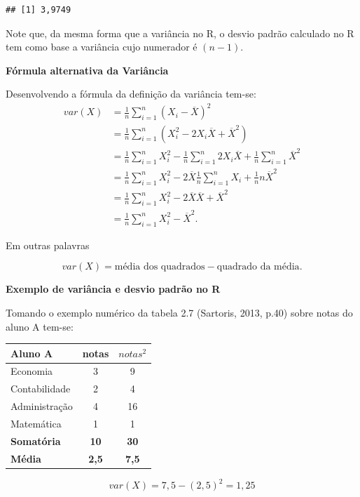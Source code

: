 \documentclass[
]{book}
\begin{document}
\begin{verbatim}
## [1] 3,9749
\end{verbatim}

Note que, da mesma forma que a variância no R, o desvio padrão calculado no R tem como base a variância cujo numerador é \((n-1)\).

\textbf{Fórmula alternativa da Variância}

Desenvolvendo a fórmula da definição da variância tem-se:
\begin{align*}
  var(X)  &= \frac{1}{n}\sum_{i=1}^{n}(X_i - \overline{X})^2 \\
          &= \frac{1}{n}\sum_{i=1}^{n}(X_i^2 - 2X_i\overline{X} +
          \overline{X}^2)\\
          &= \frac{1}{n}\sum_{i=1}^{n}X_i^2 - 
          \frac{1}{n}\sum_{i=1}^{n}2X_i\overline{X}+
          \frac{1}{n}\sum_{i=1}^{n}\overline{X}^2\\
          &= \frac{1}{n}\sum_{i=1}^{n}X_i^2 - 
          2\overline{X}\frac{1}{n}\sum_{i=1}^{n}X_i+
          \frac{1}{n}n\overline{X}^2\\
          &= \frac{1}{n}\sum_{i=1}^{n}X_i^2 - 
          2\overline{X}\overline{X}+ \overline{X}^2\\
          &= \frac{1}{n}\sum_{i=1}^{n}X_i^2 - \overline{X}^2.
\end{align*}

Em outras palavras

\begin{equation*}
  var(X) = \text{média dos quadrados} - \text{quadrado da média}.
\end{equation*}

\textbf{Exemplo de variância e desvio padrão no R}

Tomando o exemplo numérico da tabela 2.7 (Sartoris, 2013, p.40) sobre notas do
aluno A tem-se:

\begin{longtable}[]{@{}lcc@{}}
\toprule
Aluno A & notas & \(notas^2\)\tabularnewline
\midrule
\endhead
Economia & 3 & 9\tabularnewline
Contabilidade & 2 & 4\tabularnewline
Administração & 4 & 16\tabularnewline
Matemática & 1 & 1\tabularnewline
\textbf{Somatória} & \textbf{10} & \textbf{30}\tabularnewline
\textbf{Média} & \textbf{2,5} & \textbf{7,5}\tabularnewline
\bottomrule
\end{longtable}

\begin{equation*}
  var(X) = 7,5 - (2,5)^2 = 1,25
\end{equation*}
\end{document}
